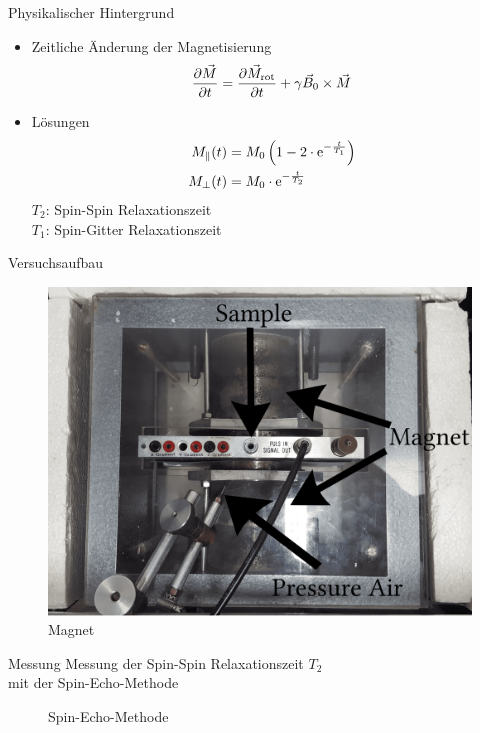 \begin{frame}{Physikalischer Hintergrund}
	\begin{itemize}
	\item Zeitliche Änderung der Magnetisierung
	\begin{align*}
	\pdv{\vec{M}}{t}=\pdv{\vec{M}_\text{rot}}{t}+\gamma\vec{B}_0\times\vec{M}
	\end{align*}
	\item Lösungen
	\begin{align*}
	M_\parallel (t)&=M_0\left(1-2\cdot\mathrm{e}^{-\frac{t}{T_1}}\right)\\
	M_\bot(t)&=M_0\cdot\mathrm{e}^{-\frac{t}{T_2}}
	\end{align*}
	$T_{2}$: Spin-Spin Relaxationszeit\\
	$T_{1}$: Spin-Gitter Relaxationszeit
	\end{itemize}
\end{frame}

\begin{frame}{Versuchsaufbau}
	\begin{figure}
	\centering
	\includegraphics[scale=.075]{images//magnet.png}
	\caption{Magnet}
	\end{figure}
\end{frame}

\begin{frame}{Messung}
Messung der Spin-Spin Relaxationszeit $T_2$\\mit der Spin-Echo-Methode %
	\begin{figure}
	\centering
	
	\caption{Spin-Echo-Methode}
	\end{figure}
\end{frame}

